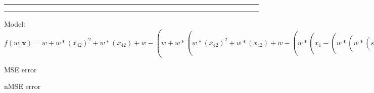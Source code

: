 \documentclass[12pt]{article}
\begin{document}
\hrule
\vspace{1cm}
\hrule
\vspace{1cm}
Model: $f(w,\mathbf{x})=w+w*(x_42)^2+w*(x_42)+w-(w+w*(w*(x_42)^2+w*(x_42)+w-(w*(x_1-(w*(w*(sin(w+x_13-(w*(w+w+x_21)^2+w*(w+w+x_21)+w)))^2+w*(sin(w+x_13-(w*(w+w+x_21)^2+w*(w+w+x_21)+w)))+w)^2+w*(w*(sin(w+x_13-(w*(w+w+x_21)^2+w*(w+w+x_21)+w)))^2+w*(sin(w+x_13-(w*(w+w+x_21)^2+w*(w+w+x_21)+w)))+w)+w))^2+w*(x_1-(w*(w*(sin(w+x_13-(w*(w+w+x_21)^2+w*(w+w+x_21)+w)))^2+w*(sin(w+x_13-(w*(w+w+x_21)^2+w*(w+w+x_21)+w)))+w)^2+w*(w*(sin(w+x_13-(w*(w+w+x_21)^2+w*(w+w+x_21)+w)))^2+w*(sin(w+x_13-(w*(w+w+x_21)^2+w*(w+w+x_21)+w)))+w)+w))+w)-(w*(x_4)^2+w*(x_4)+w))^2+w*(w*(x_42)^2+w*(x_42)+w-(w*(x_1-(w*(w*(sin(w+x_13-(w*(w+w+x_21)^2+w*(w+w+x_21)+w)))^2+w*(sin(w+x_13-(w*(w+w+x_21)^2+w*(w+w+x_21)+w)))+w)^2+w*(w*(sin(w+x_13-(w*(w+w+x_21)^2+w*(w+w+x_21)+w)))^2+w*(sin(w+x_13-(w*(w+w+x_21)^2+w*(w+w+x_21)+w)))+w)+w))^2+w*(x_1-(w*(w*(sin(w+x_13-(w*(w+w+x_21)^2+w*(w+w+x_21)+w)))^2+w*(sin(w+x_13-(w*(w+w+x_21)^2+w*(w+w+x_21)+w)))+w)^2+w*(w*(sin(w+x_13-(w*(w+w+x_21)^2+w*(w+w+x_21)+w)))^2+w*(sin(w+x_13-(w*(w+w+x_21)^2+w*(w+w+x_21)+w)))+w)+w))+w)-(w*(x_4)^2+w*(x_4)+w))+w-(w*(x_48)^2+w*(x_48)+w))$

MSE error

nMSE error
\end{document}
